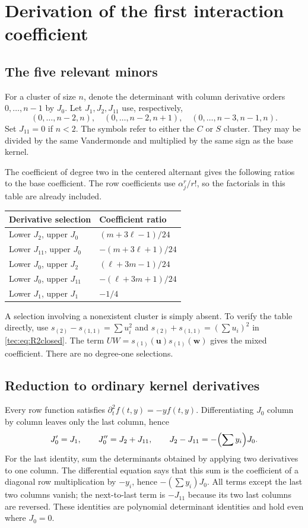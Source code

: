 \documentclass[11pt,a4paper]{article}
\numberwithin{equation}{section}
\theoremstyle{definition}
\theoremstyle{remark}
\newcommand{\bu}{\boldsymbol u}
\newcommand{\bw}{\boldsymbol w}
\begin{document}
\section{Derivation of the first interaction coefficient}\label{tec:sec:first}
\subsection{The five relevant minors}
For a cluster of size $n$, denote the determinant with column derivative
orders $0,\ldots,n-1$ by $J_0$. Let $J_1,J_2,J_{11}$ use, respectively,
\[
 (0,\ldots,n-2,n),\quad
 (0,\ldots,n-2,n+1),\quad
 (0,\ldots,n-3,n-1,n).
\]
Set $J_{11}=0$ if $n<2$. The symbols refer to either the $C$ or $S$
cluster. They may be divided by the same Vandermonde and multiplied by
the same sign as the base kernel.

The coefficient of degree two in the centered alternant gives the
following ratios to the base coefficient. The row coefficients use
$\alpha_j^r/r!$, so the factorials in this table are already included.
\begin{center}
\begin{tabular}{@{}ll@{}}\toprule
Derivative selection & Coefficient ratio\\\midrule
Lower $J_2$, upper $J_0$ & $(m+3\ell-1)/24$\\
Lower $J_{11}$, upper $J_0$ & $-(m+3\ell+1)/24$\\
Lower $J_0$, upper $J_2$ & $(\ell+3m-1)/24$\\
Lower $J_0$, upper $J_{11}$ & $-(\ell+3m+1)/24$\\
Lower $J_1$, upper $J_1$ & $-1/4$\\\bottomrule
\end{tabular}
\end{center}
A selection involving a nonexistent cluster is simply absent. To verify
the table directly, use $s_{(2)}-s_{(1,1)}=\sum u_i^2$ and
$s_{(2)}+s_{(1,1)}=(\sum u_i)^2$ in \eqref{tec:eq:R2closed}.
The term $UW=s_{(1)}(\bu)s_{(1)}(\bw)$ gives the mixed coefficient.
There are no degree-one selections.

\subsection{Reduction to ordinary kernel derivatives}
Every row function satisfies $\partial_t^2f(t,y)=-yf(t,y)$. Differentiating
$J_0$ column by column leaves only the last column, hence
\begin{equation}\label{tec:eq:Jrelations}
 J_0'=J_1,\qquad J_0''=J_2+J_{11},\qquad
 J_2-J_{11}=-\Bigl(\sum y_i\Bigr)J_0.
\end{equation}
For the last identity, sum the determinants obtained by applying two
derivatives to one column. The differential equation says that this sum
is the coefficient of a diagonal row multiplication by $-y_i$, hence
$-(\sum y_i)J_0$. All terms except the last two columns vanish; the
next-to-last term is $-J_{11}$ because its two last columns are reversed.
These identities are polynomial determinant identities and hold even
where $J_0=0$.
\end{document}
